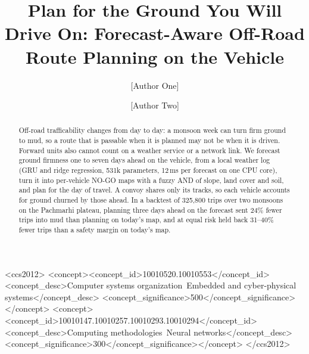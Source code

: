 \documentclass[sigconf]{acmart}
\begin{document}
\title{Plan for the Ground You Will Drive On: Forecast-Aware Off-Road Route Planning on the Vehicle}

\author{[Author One]}
\author{[Author Two]}

\begin{abstract}
Off-road trafficability changes from day to day: a monsoon week can turn firm ground to
mud, so a route that is passable when it is planned may not be when it is driven. Forward
units also cannot count on a weather service or a network link. We forecast ground
firmness one to seven days ahead on the vehicle, from a local weather log (GRU and ridge
regression, 531k parameters, 12\,ms per forecast on one CPU core), turn it into
per-vehicle NO-GO maps with a fuzzy AND of slope, land cover and soil, and plan for the day
of travel. A convoy shares only its tracks, so each vehicle accounts for ground churned by
those ahead. In a backtest of 325,800 trips over two monsoons on the Pachmarhi plateau,
planning three days ahead on the forecast sent 24\% fewer trips into mud than planning
on today's map, and at equal risk held back 31--40\% fewer trips than a safety margin
on today's map.
\end{abstract}

\begin{CCSXML}
<ccs2012>
<concept><concept_id>10010520.10010553</concept_id>
<concept_desc>Computer systems organization~Embedded and cyber-physical systems</concept_desc>
<concept_significance>500</concept_significance></concept>
<concept><concept_id>10010147.10010257.10010293.10010294</concept_id>
<concept_desc>Computing methodologies~Neural networks</concept_desc>
<concept_significance>300</concept_significance></concept>
</ccs2012>
\end{CCSXML}


\maketitle
\end{document}
